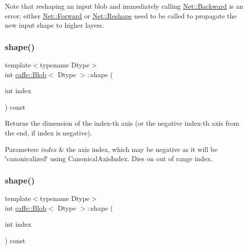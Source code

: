 Note that reshaping an input blob and immediately calling \mbox{\hyperlink{classcaffe_1_1_net_a7a1a6d17347106dd1284b1b6d28cb4e9}{Net\+::\+Backward}} is an error; either \mbox{\hyperlink{classcaffe_1_1_net_a6f6cf9d40637f7576828d856bb1b1826}{Net\+::\+Forward}} or \mbox{\hyperlink{classcaffe_1_1_net_a8417af82aa83be45d39aab735bdead1d}{Net\+::\+Reshape}} need to be called to propagate the new input shape to higher layers. \mbox{\label{classcaffe_1_1_blob_a807f4da98e8e0d1f60badb1f540fe010}} 
\subsubsection{\texorpdfstring{shape()}{shape()}\hspace{0.1cm}{\footnotesize\ttfamily [1/2]}}
{\footnotesize\ttfamily template$<$typename Dtype$>$ \\
int \mbox{\hyperlink{classcaffe_1_1_blob}{caffe\+::\+Blob}}$<$ Dtype $>$\+::shape (\begin{DoxyParamCaption}\item[{int}]{index }\end{DoxyParamCaption}) const\hspace{0.3cm}{\ttfamily [inline]}}



Returns the dimension of the index-\/th axis (or the negative index-\/th axis from the end, if index is negative). 


\begin{DoxyParams}{Parameters}
{\em index} & the axis index, which may be negative as it will be \char`\"{}canonicalized\char`\"{} using Canonical\+Axis\+Index. Dies on out of range index. \\
\hline
\end{DoxyParams}
\mbox{\label{classcaffe_1_1_blob_a807f4da98e8e0d1f60badb1f540fe010}} 
\subsubsection{\texorpdfstring{shape()}{shape()}\hspace{0.1cm}{\footnotesize\ttfamily [2/2]}}
{\footnotesize\ttfamily template$<$typename Dtype$>$ \\
int \mbox{\hyperlink{classcaffe_1_1_blob}{caffe\+::\+Blob}}$<$ Dtype $>$\+::shape (\begin{DoxyParamCaption}\item[{int}]{index }\end{DoxyParamCaption}) const\hspace{0.3cm}{\ttfamily [inline]}}



